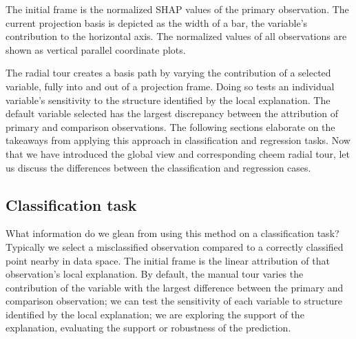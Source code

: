 \documentclass[
]{article}
\begin{document}
The initial frame is the normalized SHAP values of the primary
observation. The current projection basis is depicted as the width of a
bar, the variable's contribution to the horizontal axis. The normalized
values of all observations are shown as vertical parallel coordinate
plots.

The radial tour creates a basis path by varying the contribution of a
selected variable, fully into and out of a projection frame. Doing so
tests an individual variable's sensitivity to the structure identified
by the local explanation. The default variable selected has the largest
discrepancy between the attribution of primary and comparison
observations. The following sections elaborate on the takeaways from
applying this approach in classification and regression tasks. Now that
we have introduced the global view and corresponding cheem radial tour,
let us discuss the differences between the classification and regression
cases.

\hypertarget{classification-task}{%
\subsection{Classification task}\label{classification-task}}

What information do we glean from using this method on a classification
task? Typically we select a misclassified observation compared to a
correctly classified point nearby in data space. The initial frame is
the linear attribution of that observation's local explanation. By
default, the manual tour varies the contribution of the variable with
the largest difference between the primary and comparison observation;
we can test the sensitivity of each variable to structure identified by
the local explanation; we are exploring the support of the explanation,
evaluating the support or robustness of the prediction.
\end{document}
